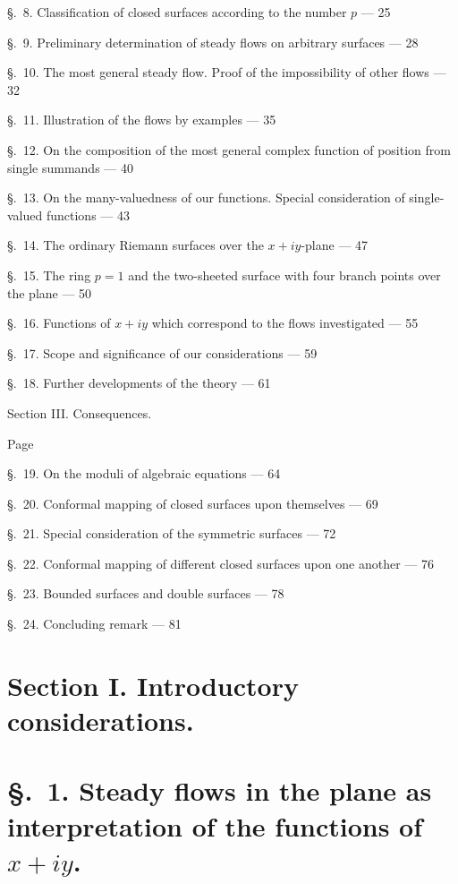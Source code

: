 \documentclass{article}
\begin{document}
§.~8. Classification of closed surfaces according to the number $p$ --- 25

§.~9. Preliminary determination of steady flows on arbitrary surfaces --- 28

§.~10. The most general steady flow. Proof of the impossibility of other flows --- 32

§.~11. Illustration of the flows by examples --- 35

§.~12. On the composition of the most general complex function of position from single summands --- 40

§.~13. On the many-valuedness of our functions. Special consideration of single-valued functions --- 43

§.~14. The ordinary Riemann surfaces over the $x + iy$-plane --- 47

§.~15. The ring $p = 1$ and the two-sheeted surface with four branch points over the plane --- 50

§.~16. Functions of $x + iy$ which correspond to the flows investigated --- 55

§.~17. Scope and significance of our considerations --- 59

§.~18. Further developments of the theory --- 61


Section III. Consequences.

Page

§.~19. On the moduli of algebraic equations --- 64

§.~20. Conformal mapping of closed surfaces upon themselves --- 69

§.~21. Special consideration of the symmetric surfaces --- 72

§.~22. Conformal mapping of different closed surfaces upon one another --- 76

§.~23. Bounded surfaces and double surfaces --- 78

§.~24. Concluding remark --- 81


\section*{Section I. Introductory considerations.}

\section*{§.~1. Steady flows in the plane as interpretation of the functions of $x + iy$.}
\end{document}
